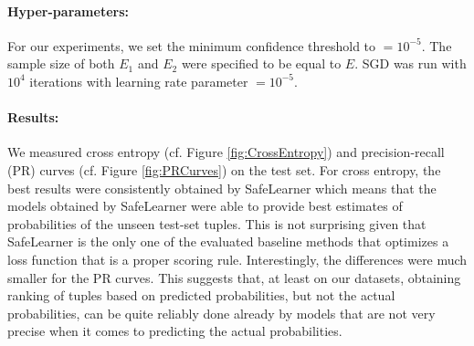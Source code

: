 \documentclass[akbc,twoside,11pt]{article}
\newcommand{\algorithmname}{SafeLearner\xspace}
\begin{document}
\paragraph{Hyper-parameters:}
For our experiments, we set the minimum confidence threshold to $= 10^{-5}$. The sample size of both $E_1$ and $E_2$ were specified to be equal to $E$. SGD was run with $10^4$ iterations with learning rate parameter $= 10^{-5}$.

\paragraph{Results:} 
We measured cross entropy (cf. Figure \ref{fig:CrossEntropy}) and precision-recall (PR) curves (cf. Figure \ref{fig:PRCurves}) on the test set. For cross entropy, the best results were consistently obtained by \algorithmname which means that the models obtained by \algorithmname were able to provide best estimates of probabilities of the unseen test-set tuples. This is not surprising given that \algorithmname is the only one of the evaluated baseline methods that optimizes a loss function that is a proper scoring rule. Interestingly, the differences were much smaller for the PR curves. This suggests that, at least on our datasets, obtaining ranking of tuples based on predicted probabilities, but not the actual probabilities, can be quite reliably done already by models that are not very precise when it comes to predicting the actual probabilities.
\end{document}
